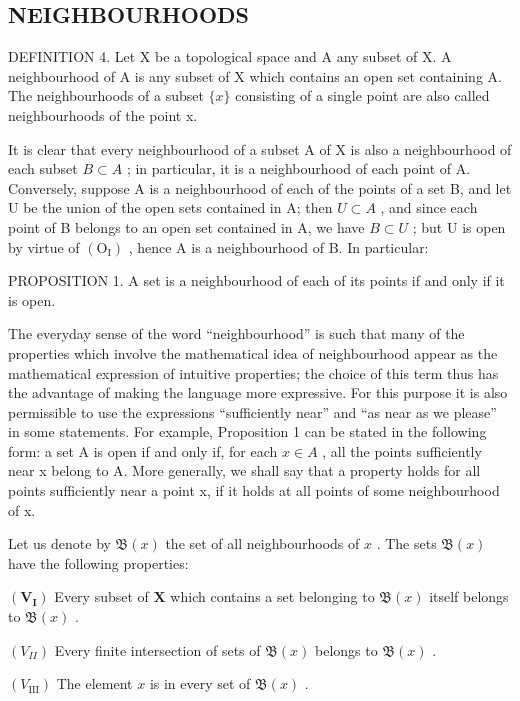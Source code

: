 \subsection{NEIGHBOURHOODS}

DEFINITION 4. Let X be a topological space and A any subset of X. A neighbourhood of A is any subset of X which contains an open set containing A. The neighbourhoods of a subset \(\{x\}\) consisting of a single point are also called neighbourhoods of the point x.

It is clear that every neighbourhood of a subset A of X is also a neighbourhood of each subset \(B \subset A\) ; in particular, it is a neighbourhood of each point of A. Conversely, suppose A is a neighbourhood of each of the points of a set B, and let U be the union of the open sets contained in A; then \(U \subset A\) , and since each point of B belongs to an open set contained in A, we have \(B \subset U\) ; but U is open by virtue of \((\mathrm{O}_{\mathrm{I}})\) , hence A is a neighbourhood of B. In particular:

PROPOSITION 1. A set is a neighbourhood of each of its points if and only if it is open.

The everyday sense of the word ``neighbourhood'' is such that many of the properties which involve the mathematical idea of neighbourhood appear as the mathematical expression of intuitive properties; the choice of this term thus has the advantage of making the language more expressive. For this purpose it is also permissible to use the expressions ``sufficiently near'' and ``as near as we please'' in some statements. For example, Proposition 1 can be stated in the following form: a set A is open if and only if, for each \(x \in A\) , all the points sufficiently near x belong to A. More generally, we shall say that a property holds for all points sufficiently near a point x, if it holds at all points of some neighbourhood of x.

Let us denote by \(\mathfrak{B}(x)\) the set of all neighbourhoods of \(x\) . The sets \(\mathfrak{B}(x)\) have the following properties:

\((\mathbf{V}_{\mathbf{I}})\) Every subset of \(\mathbf{X}\) which contains a set belonging to \(\mathfrak{B}(x)\) itself belongs to \(\mathfrak{B}(x)\) .

\((V_{II})\) Every finite intersection of sets of \(\mathfrak{B}(x)\) belongs to \(\mathfrak{B}(x)\) .

\((V_{\mathrm{III}})\) The element \(x\) is in every set of \(\mathfrak{B}(x)\) .

